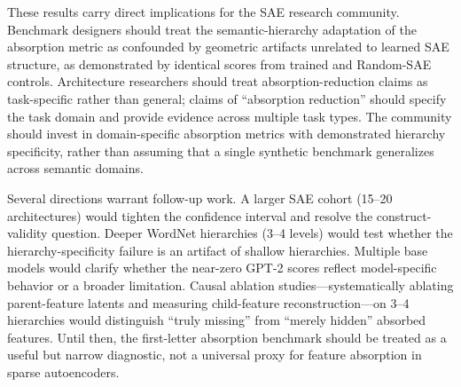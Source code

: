 \documentclass{article}
\begin{document}
These results carry direct implications for the SAE research community. Benchmark designers should treat the semantic-hierarchy adaptation of the absorption metric as confounded by geometric artifacts unrelated to learned SAE structure, as demonstrated by identical scores from trained and Random-SAE controls. Architecture researchers should treat absorption-reduction claims as task-specific rather than general; claims of ``absorption reduction'' should specify the task domain and provide evidence across multiple task types. The community should invest in domain-specific absorption metrics with demonstrated hierarchy specificity, rather than assuming that a single synthetic benchmark generalizes across semantic domains.

Several directions warrant follow-up work. A larger SAE cohort (15--20 architectures) would tighten the confidence interval and resolve the construct-validity question. Deeper WordNet hierarchies (3--4 levels) would test whether the hierarchy-specificity failure is an artifact of shallow hierarchies. Multiple base models would clarify whether the near-zero GPT-2 scores reflect model-specific behavior or a broader limitation. Causal ablation studies---systematically ablating parent-feature latents and measuring child-feature reconstruction---on 3--4 hierarchies would distinguish ``truly missing'' from ``merely hidden'' absorbed features. Until then, the first-letter absorption benchmark should be treated as a useful but narrow diagnostic, not a universal proxy for feature absorption in sparse autoencoders.



\end{document}
